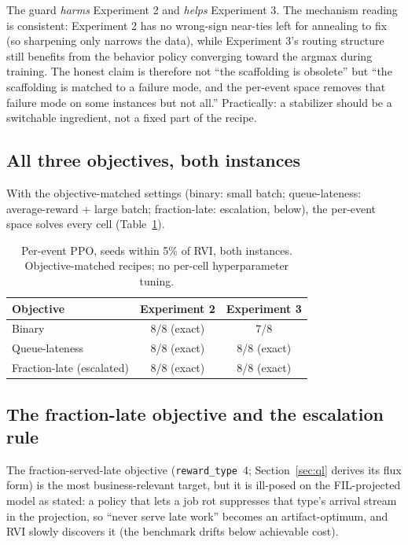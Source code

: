 \documentclass[11pt,a4paper]{article}
\begin{document}
The guard \emph{harms} Experiment 2 and \emph{helps} Experiment 3.  The
mechanism reading is consistent: Experiment 2 has no wrong-sign near-ties
left for annealing to fix (so sharpening only narrows the data), while
Experiment 3's routing structure still benefits from the behavior policy
converging toward the argmax during training.  The honest claim is
therefore not ``the scaffolding is obsolete'' but ``the scaffolding is
matched to a failure mode, and the per-event space removes that failure
mode on some instances but not all.''  Practically: a stabilizer should
be a switchable ingredient, not a fixed part of the recipe.

\subsection{All three objectives, both instances}
\label{sec:pe-complete}

With the objective-matched settings (binary: small batch; queue-lateness:
average-reward + large batch; fraction-late: escalation, below), the
per-event space solves every cell (Table~\ref{tab:pe-complete}).

\begin{table}[h]
\centering
\caption{Per-event PPO, seeds within 5\% of RVI, both instances.
Objective-matched recipes; no per-cell hyperparameter tuning.}
\label{tab:pe-complete}
\begin{tabular}{lcc}
\toprule
Objective & Experiment 2 & Experiment 3 \\
\midrule
Binary            & 8/8 (exact) & 7/8 \\
Queue-lateness    & 8/8 (exact) & 8/8 (exact) \\
Fraction-late (escalated) & 8/8 (exact) & 8/8 (exact) \\
\bottomrule
\end{tabular}
\end{table}

\subsection{The fraction-late objective and the escalation rule}
\label{sec:pe-escalation}

The fraction-served-late objective (\texttt{reward\_type}~4;
Section~\ref{sec:ql} derives its flux form) is the most business-relevant
target, but it is ill-posed on the FIL-projected model as stated: a
policy that lets a job rot suppresses that type's arrival stream in the
projection, so ``never serve late work'' becomes an artifact-optimum, and
RVI slowly discovers it (the benchmark drifts below achievable cost).
\end{document}

